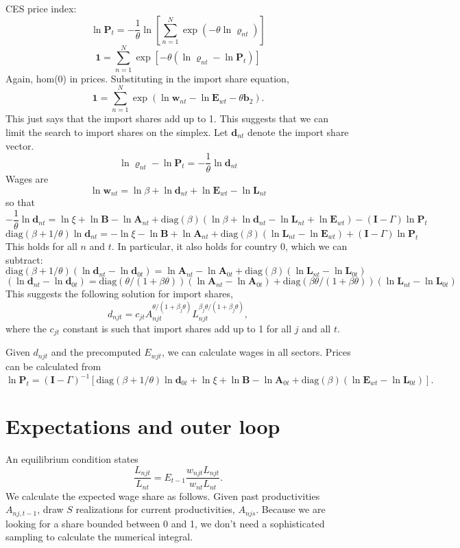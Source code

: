 \documentclass[12pt]{article}
\begin{document}
CES price index:
\[
\ln\mathbf P_{t} = -\frac1\theta
 \ln \left[
 	\sum_{n=1}^N \exp(-\theta \ln \varrho_{nt})
 \right]
\]
\[
\mathbf 1 =  
 	\sum_{n=1}^N \exp[-\theta (\ln \varrho_{nt}-\ln\mathbf P_{t})]
\]
Again, hom(0) in prices. Substituting in the import share equation,
\[
\mathbf 1 =  
 	\sum_{n=1}^N \exp(\ln\mathbf w_{nt}-\ln\mathbf E_{wt}-\theta\mathbf b_2).
\]
This just says that the import shares add up to 1. This suggests that we can limit the search to import shares on the simplex. Let $\mathbf d_{nt}$ denote the import share vector.
\[
\ln\mathbf \varrho_{nt} - \ln\mathbf P_{t} 
 = -\frac1\theta \ln\mathbf d_{nt}
\]
Wages are
\[
\ln\mathbf w_{nt} = \ln\beta+\ln\mathbf d_{nt}+\ln\mathbf E_{wt}-\ln\mathbf L_{nt}
\]
so that
\[
-\frac1\theta \ln\mathbf d_{nt} = 
\ln\xi
	+ \ln\mathbf B
	- \ln\mathbf A_{nt}
+
\text{diag}(\beta)(\ln\beta+\ln\mathbf d_{nt}-\ln\mathbf L_{nt}+\ln\mathbf E_{wt})
- (\mathbf I-\Gamma) \ln\mathbf P_{t}  
\]
\[
\text{diag}(\beta+1/\theta) \ln\mathbf d_{nt} = 
-\ln\xi
	- \ln\mathbf B
	+ \ln\mathbf A_{nt}
+
\text{diag}(\beta)(\ln\mathbf L_{nt}-\ln\mathbf E_{wt})
+ (\mathbf I-\Gamma) \ln\mathbf P_{t}  
\]
This holds for all $n$ and $t$. In particular, it also holds for country $0$, which we can subtract:
\[
\text{diag}(\beta+1/\theta) (\ln\mathbf d_{nt}-\ln\mathbf d_{0t}) = 
	\ln\mathbf A_{nt}-\ln\mathbf A_{0t}
+
\text{diag}(\beta)(\ln\mathbf L_{nt}-\ln\mathbf L_{0t})
\]
\[
(\ln\mathbf d_{nt}-\ln\mathbf d_{0t}) = 
	\text{diag}(\theta/(1+\beta\theta)) (\ln\mathbf A_{nt}-\ln\mathbf A_{0t})
+
\text{diag}(\beta\theta/(1+\beta\theta))(\ln\mathbf L_{nt}-\ln\mathbf L_{0t})
\]
This suggests the following solution for import shares,
\[
d_{njt} = c_{jt}A_{njt}^{\theta/(1+\beta_j\theta)}L_{njt}^{\beta_j\theta/(1+\beta_j\theta)},
\]
where the $c_{jt}$ constant is such that import shares add up to 1 for all $j$ and all $t$.

Given $d_{njt}$ and the precomputed $E_{wjt}$, we can calculate wages in all sectors. Prices can be calculated from
\[
\ln\mathbf P_{t} = 
(\mathbf I-\Gamma)^{-1}[\text{diag}(\beta+1/\theta) \ln\mathbf d_{0t}  
+\ln\xi
	+ \ln\mathbf B
	- \ln\mathbf A_{0t}
+
\text{diag}(\beta)(\ln\mathbf E_{wt}-\ln\mathbf L_{0t})]
 .  
\]

\section{Expectations and outer loop}
An equilibrium condition states
\begin{equation}
	\frac 
		{L_{njt}}
		{L_{nt}}
	=
	E_{t-1}\frac 
		{w_{njt}L_{njt}}
		{w_{nt}L_{nt}}.
\end{equation}
We calculate the expected wage share as follows. Given past productivities $A_{nj,t-1}$, draw $S$ realizations for current productivities, $A_{njs}$. Because we are looking for a share bounded between 0 and 1, we don't need a sophisticated sampling to calculate the numerical integral. 
\end{document}
